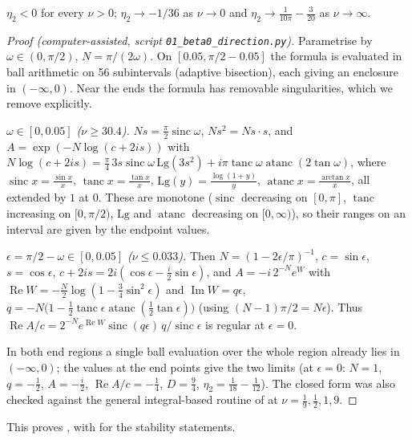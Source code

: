 \documentclass[11pt,a4paper]{report}
\begin{document}
\begin{lemma}\label{lem:beta0sign}
$\eta_2<0$ for every $\nu>0$; $\eta_2\to-1/36$ as $\nu\to0$ and $\eta_2\to\frac1{10\pi}-\frac3{20}$ as $\nu\to\infty$.
\end{lemma}
\begin{proof}[Proof (computer-assisted, script \texttt{01\_beta0\_direction.py})]
Parametrise by $\omega\in(0,\pi/2)$, $N=\pi/(2\omega)$. On $[0.05,\pi/2-0.05]$ the formula is evaluated in ball arithmetic on 56 subintervals (adaptive bisection), each giving an enclosure in $(-\infty,0)$. Near the ends the formula has removable singularities, which we remove explicitly.

\emph{$\omega\in[0,0.05]$ ($\nu\ge30.4$).} $Ns=\frac\pi2\operatorname{sinc}\omega$, $Ns^2=Ns\cdot s$, and $A=\exp(-N\log(c+2is))$ with $N\log(c+2is)=\frac\pi4\,3s\operatorname{sinc}\omega\,\mathrm{Lg}(3s^2)+i\pi\operatorname{tanc}\omega\operatorname{atanc}(2\tan\omega)$, where $\operatorname{sinc}x=\frac{\sin x}x$, $\operatorname{tanc}x=\frac{\tan x}x$, $\mathrm{Lg}(y)=\frac{\log(1+y)}y$, $\operatorname{atanc}x=\frac{\arctan x}x$, all extended by $1$ at $0$. These are monotone ($\operatorname{sinc}$ decreasing on $[0,\pi]$, $\operatorname{tanc}$ increasing on $[0,\pi/2)$, $\mathrm{Lg}$ and $\operatorname{atanc}$ decreasing on $[0,\infty)$), so their ranges on an interval are given by the endpoint values.

\emph{$\epsilon=\pi/2-\omega\in[0,0.05]$ ($\nu\le0.033$).} Then $N=(1-2\epsilon/\pi)^{-1}$, $c=\sin\epsilon$, $s=\cos\epsilon$, $c+2is=2i(\cos\epsilon-\frac i2\sin\epsilon)$, and $A=-i\,2^{-N}e^W$ with $\operatorname{Re}W=-\frac N2\log(1-\frac34\sin^2\epsilon)$ and $\operatorname{Im}W=q\epsilon$, $q=-N\bigl(1-\frac12\operatorname{tanc}\epsilon\operatorname{atanc}(\frac12\tan\epsilon)\bigr)$ (using $(N-1)\pi/2=N\epsilon$). Thus $\operatorname{Re}A/c=2^{-N}e^{\operatorname{Re}W}\operatorname{sinc}(q\epsilon)\,q/\operatorname{sinc}\epsilon$ is regular at $\epsilon=0$.

In both end regions a single ball evaluation over the whole region already lies in $(-\infty,0)$; the values at the end points give the two limits (at $\epsilon=0$: $N=1$, $q=-\frac12$, $A=-\frac i2$, $\operatorname{Re}A/c=-\frac14$, $D=\frac94$, $\eta_2=\frac1{18}-\frac1{12}$). The closed form was also checked against the general integral-based routine of  at $\nu=\frac19,\frac12,1,9$.
\end{proof}

This proves , with  for the stability statements.
\end{document}
